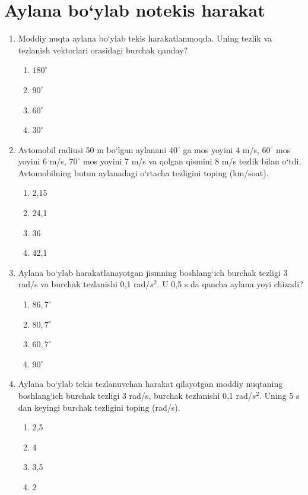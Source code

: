 \section{Aylana bo`ylab notekis harakat}


\begin{enumerate}

\item Moddiy nuqta aylana bo‘ylab tekis harakatlanmoqda. Uning tezlik va tezlanish vektorlari orasidagi burchak qanday?
\begin{enumerate}[label=\Alph*)]
\item $180^\circ$
\item $90^\circ$
\item $60^\circ$
\item $30^\circ$

\end{enumerate}

\item Avtomobil radiusi 50 m bo‘lgan aylanani $40^\circ$ ga mos yoyini 4 m/s, $60^\circ$ mos yoyini 6 m/s, $70^\circ$ mos yoyini 7 m/s va qolgan qismini 8 m/s tezlik bilan o‘tdi. Avtomobilning butun aylanadagi o‘rtacha tezligini toping (km/soat).
\begin{enumerate}[label=\Alph*)]
\item 2,15
\item 24,1
\item 36
\item 42,1

\end{enumerate}

\item Aylana bo‘ylab harakatlanayotgan jismning boshlang‘ich burchak tezligi 3 rad/s va burchak tezlanishi 0,1 rad/$s^2$. U 0,5 s da qancha aylana yoyi chizadi?
\begin{enumerate}[label=\Alph*)]
\item $86,7^\circ$
\item $80,7^\circ$
\item $60,7^\circ$
\item $90^\circ$

\end{enumerate}

\item Aylana bo‘ylab tekis tezlanuvchan harakat qilayotgan moddiy nuqtaning boshlang‘ich burchak tezligi 3 rad/s, burchak tezlanishi 0,1 rad/$s^2$. Uning 5 s dan keyingi burchak tezligini toping (rad/s).
\begin{enumerate}[label=\Alph*)]
\item 2,5
\item 4
\item 3,5
\item 2


\end{enumerate}
\end{enumerate}
